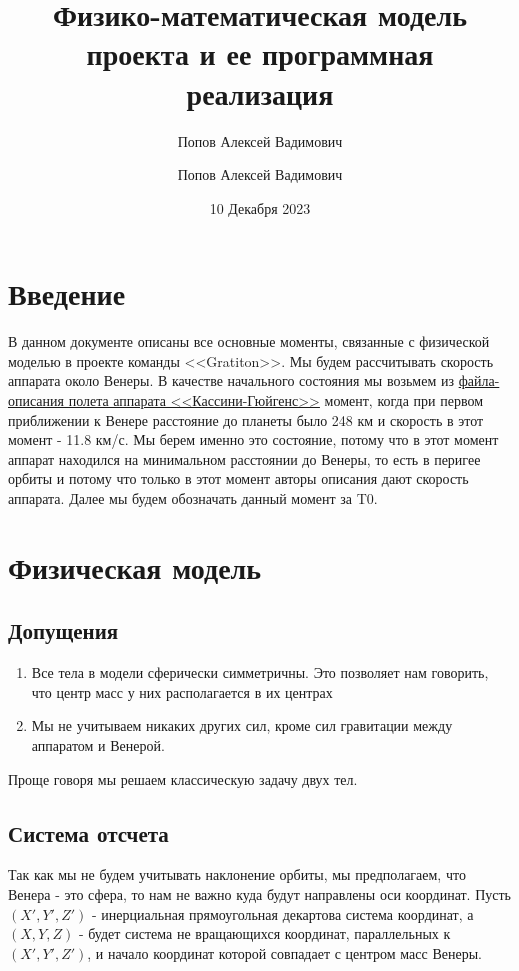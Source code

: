 \documentclass{article}
\title{Физико-математическая модель проекта и ее программная реализация}
\author{Попов Алексей Вадимович}
\author{Попов Алексей Вадимович}
\date{10 Декабря 2023}
\begin{document}
    \maketitle
    \section{Введение}
    В данном документе описаны все основные моменты, связанные с физической моделью в проекте команды <<Gratiton>>. Мы будем рассчитывать скорость аппарата около Венеры. В качестве начального состояния мы возьмем из \href{https://pds-atmospheres.nmsu.edu/data_and_services/atmospheres_data/Cassini_PDS3/mission-cat_3-26-13}{файла-описания полета аппарата <<Кассини-Гюйгенс>>} момент, когда при первом приближении к Венере расстояние до планеты было 248 км и скорость в этот момент - 11.8 км/с. Мы берем именно это состояние, потому что в этот момент аппарат находился на минимальном расстоянии до Венеры, то есть в перигее орбиты и потому что только в этот момент авторы описания дают скорость аппарата. Далее мы будем обозначать данный момент за T0.
    \section{Физическая модель}
    \subsection{Допущения}
    \begin{enumerate}
        \item Все тела в модели сферически симметричны. Это позволяет нам говорить, что центр масс у них располагается в их центрах
        \item Мы не учитываем никаких других сил, кроме сил гравитации между аппаратом и Венерой.
    \end{enumerate}
    Проще говоря мы решаем классическую задачу двух тел.
    \subsection{Система отсчета}
    Так как мы не будем учитывать наклонение орбиты, мы предполагаем, что Венера - это сфера, то нам не важно куда будут направлены оси координат. Пусть $(X', Y', Z')$ - инерциальная прямоугольная декартова система координат, а $(X, Y, Z)$ - будет система не вращающихся координат, параллельных к $(X', Y', Z')$, и начало координат которой совпадает с центром масс Венеры.
\end{document}
